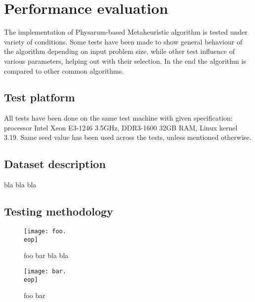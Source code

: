 \section{Performance evaluation}
\label{section:project_evaluation}

The implementation of Physarum-based Metaheuristic algorithm is tested under variety of conditions. Some tests have been made to show general behaviour of the algorithm depending on input problem size, while other test influence of various parameters, helping out with their selection. In the end the algorithm is compared to other common algorithms.


\subsection{Test platform}

All tests have been done on the same test machine with given specification: processor Intel Xeon E3-1246 3.5GHz, DDR3-1600 32GB RAM, Linux kernel 3.19. Same seed value has been used across the tests, unless mentioned otherwise.


\subsection{Dataset description}

bla bla bla

\subsection{Testing methodology}

\begin{figure}
  \centering

  \texttt{[image: foo.\\eop]}

  \caption{foo bar bla bla}

\end{figure}

\begin{figure}
  \centering

  \texttt{[image: bar.\\eop]}

  \caption{foo bar}

\end{figure}


